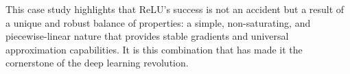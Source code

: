 This case study highlights that ReLU's success is not an accident but a result of a unique and robust balance of properties: a simple, non-saturating, and piecewise-linear nature that provides stable gradients and universal approximation capabilities. It is this combination that has made it the cornerstone of the deep learning revolution.

\ifdefined\ispartofbook
\else
  
  
\fi
